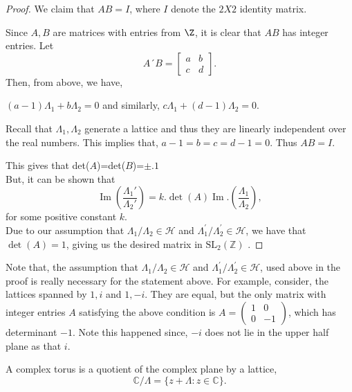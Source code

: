 \begin{lemma}
\begin{proof}
We claim that $AB=I$, where $I$ denote the $2X2$ identity matrix. 

Since $A,B$ are matrices with entries from $\Z$, it is clear that $AB$ has integer entries. Let $$A´B=\left[\begin{array}{cc} a & b \\ c & d \end{array}\right].$$
Then, from above, we have,

$(a-1)\Lambda_1+b\Lambda_2=0$ and similarly, $c\Lambda_1+(d-1)\Lambda_2=0$. 

Recall that $\Lambda_1, \Lambda_2$ generate a lattice and thus they are linearly independent over the real numbers. This implies that, $a-1=b=c=d-1=0$. Thus $AB=I$. 

This gives that det($A$)=det($B$)=$\pm.1$\\

But, it can be shown that $$\operatorname{Im}(\frac{\Lambda_1'}{\Lambda_2'})=k.\operatorname{det}(A)\operatorname{Im}.(\frac{\Lambda_1}{\Lambda_2}),$$ for some positive constant $k$. \\
Due to our assumption that $\Lambda_{1} / \Lambda_{2} \in \mathcal{H}$ and $\Lambda_{1}^{\prime} / \Lambda_{2}^{\prime} \in \mathcal{H}$, we have that $\operatorname{det}(A)=1$, giving us the desired matrix in $\mathrm{SL}_{2}(\mathbb{Z})$ .


\end{proof}
\end{lemma}

\begin{remark}
Note that, the assumption that $\Lambda_{1} / \Lambda_{2} \in \mathcal{H}$ and $\Lambda_{1}^{\prime} / \Lambda_{2}^{\prime} \in \mathcal{H}$, used above in the proof is really necessary for the statement above. For example, consider, the lattices spanned by \(1, i\) and \(1, -i\). They are equal, but the only matrix with integer entries \(A\) satisfying the above condition is \(A = \begin{pmatrix} 1 & 0 \\ 0 & -1 \end{pmatrix}\), which has determinant \(-1\). Note this happened since, $-i$ does not lie in the upper half plane as that $i$. 
\end{remark}

\begin{definition}    
A complex torus is a quotient of the complex plane by a lattice,
$$
\mathbb{C} / \Lambda=\{z+\Lambda: z \in \mathbb{C}\} .
$$
\end{definition}


